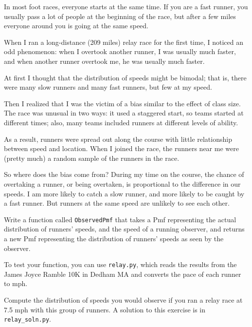 \begin{exercise}
\label{relay}

In most foot races, everyone starts at the same time.  If you are a
fast runner, you usually pass a lot of people at the beginning of the
race, but after a few miles everyone around you is going at the same
speed.

When I ran a long-distance (209 miles) relay race for the first
time, I noticed an odd phenomenon: when I overtook another runner, I
was usually much faster, and when another runner overtook me, he was
usually much faster.

At first I thought that the distribution of speeds might be bimodal;
that is, there were many slow runners and many fast runners, but few
at my speed.

Then I realized that I was the victim of a bias similar to the
effect of class size.  The race
was unusual in two ways: it used a staggered start, so teams started
at different times; also, many teams included runners at different
levels of ability.  

As a result, runners were spread out along the course with little
relationship between speed and location.  When I joined the race, the
runners near me were (pretty much) a random sample of the runners in
the race.

So where does the bias come from?  During my time on the course, the
chance of overtaking a runner, or being overtaken, is proportional to
the difference in our speeds.  I am more likely to catch a slow
runner, and more likely to be caught by a fast runner.  But runners
at the same speed are unlikely to see each other.

Write a function called {\tt ObservedPmf} that takes a Pmf representing
the actual distribution of runners' speeds, and the speed of a running
observer, and returns a new Pmf representing the distribution of
runners' speeds as seen by the observer.

To test your function, you can use {\tt relay.py}, which  reads the
results from the James Joyce Ramble 10K in Dedham MA and converts the
pace of each runner to mph.

Compute the distribution of speeds you would observe if you ran a
relay race at 7.5 mph with this group of runners.  A solution to this
exercise is in \verb"relay_soln.py".
\end{exercise}


